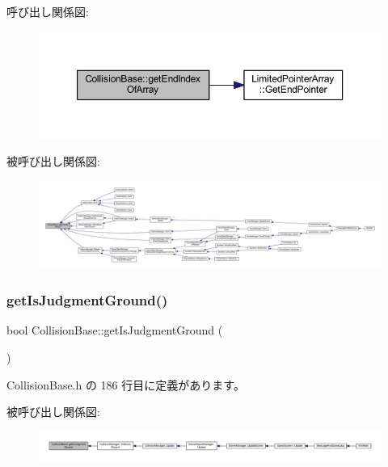 呼び出し関係図\+:\nopagebreak
\begin{figure}[H]
\begin{center}
\leavevmode
\includegraphics[width=350pt]{class_collision_base_ac1d7000c820fabfa604138cda30a40a1_cgraph}
\end{center}
\end{figure}
被呼び出し関係図\+:
\nopagebreak
\begin{figure}[H]
\begin{center}
\leavevmode
\includegraphics[width=350pt]{class_collision_base_ac1d7000c820fabfa604138cda30a40a1_icgraph}
\end{center}
\end{figure}
\mbox{\label{class_collision_base_a7b9cd927976308f8719f3becc03b99a1}} 
\subsubsection{\texorpdfstring{get\+Is\+Judgment\+Ground()}{getIsJudgmentGround()}}
{\footnotesize\ttfamily bool Collision\+Base\+::get\+Is\+Judgment\+Ground (\begin{DoxyParamCaption}{ }\end{DoxyParamCaption})\hspace{0.3cm}{\ttfamily [inline]}}



 Collision\+Base.\+h の 186 行目に定義があります。

被呼び出し関係図\+:
\nopagebreak
\begin{figure}[H]
\begin{center}
\leavevmode
\includegraphics[width=350pt]{class_collision_base_a7b9cd927976308f8719f3becc03b99a1_icgraph}
\end{center}
\end{figure}
\mbox{\label{class_collision_base_af4e773951a4e1965e64410841a0292a4}} 
